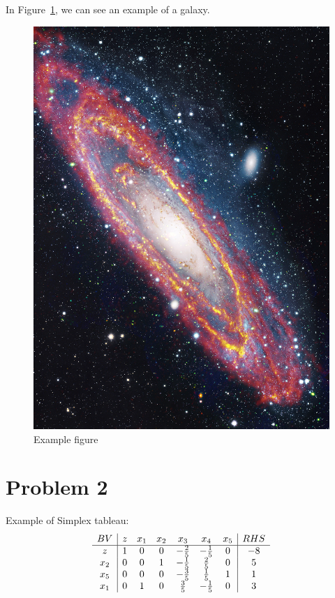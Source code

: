 In Figure~\ref{fig:universe}, we can see an example of a galaxy.
\begin{figure}[h!]
    \centering
    \includegraphics[scale=0.5]{figures/universe.jpg}
    \caption{Example figure}
    \label{fig:universe}
\end{figure}


\pagebreak
\section{Problem 2}

Example of Simplex tableau:
\begin{align}
    \begin{array}{c | cccccc | c}
         BV  & z & x_1 & x_2 & x_3 & x_4 & x_5 & RHS \\ 
         \hline %
         z   & 1 & 0 & 0 & -\tfrac{2}{5} & -\tfrac{1}{5} & 0 & -8 \\
         x_2 & 0 & 0 & 1 & -\tfrac{1}{5} & \tfrac{2}{5}  & 0 & 5 \\
         x_5 & 0 & 0 & 0 & -\tfrac{3}{5} & \tfrac{1}{5}  & 1 & 1 \\
         x_1 & 0 & 1 & 0 & \tfrac{3}{5}  & -\tfrac{1}{5} & 0 & 3
    \end{array}
\end{align}


